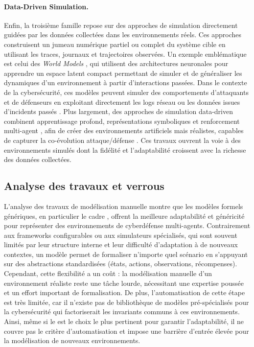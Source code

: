 \paragraph{Data-Driven Simulation.}
Enfin, la troisième famille repose sur des approches de simulation directement guidées par les données collectées dans les environnements réels. Ces approches construisent un jumeau numérique partiel ou complet du système cible en utilisant les traces, journaux et trajectoires observées. Un exemple emblématique est celui des \textit{World Models} \cite{Ha2018}, qui utilisent des architectures neuronales pour apprendre un espace latent compact permettant de simuler et de généraliser les dynamiques d’un environnement à partir d’interactions passées. Dans le contexte de la cybersécurité, ces modèles peuvent simuler des comportements d’attaquants et de défenseurs en exploitant directement les logs réseau ou les données issues d’incidents passés \cite{D2mbiT0vgP4J}. Plus largement, des approches de simulation data-driven combinent apprentissage profond, représentations symboliques et renforcement multi-agent \cite{5oUSbVbTXX0J, RQyw5NYMj-wJ}, afin de créer des environnements artificiels mais réalistes, capables de capturer la co-évolution attaque/défense \cite{oOfK6FXUSCAJ}. Ces travaux ouvrent la voie à des environnements simulés dont la fidélité et l’adaptabilité croissent avec la richesse des données collectées.

\subsection*{Analyse des travaux et verrous}

L’analyse des travaux de modélisation manuelle montre que les modèles formels génériques, en particulier le cadre , offrent la meilleure adaptabilité et généricité pour représenter des environnements de cyberdéfense multi-agents. Contrairement aux frameworks configurables ou aux simulateurs spécialisés, qui sont souvent limités par leur structure interne et leur difficulté d’adaptation à de nouveaux contextes, un modèle  permet de formaliser n’importe quel scénario en s’appuyant sur des abstractions standardisées (états, actions, observations, récompenses). Cependant, cette flexibilité a un coût : la modélisation manuelle d’un environnement réaliste reste une tâche lourde, nécessitant une expertise poussée et un effort important de formalisation. De plus, l’automatisation de cette étape est très limitée, car il n’existe pas de bibliothèque de modèles  pré-spécialisés pour la cybersécurité qui factoriserait les invariants communs à ces environnements. Ainsi, même si le  est le choix le plus pertinent pour garantir l’adaptabilité, il ne couvre pas le critère d’automatisation et impose une barrière d’entrée élevée pour la modélisation de nouveaux environnements.

